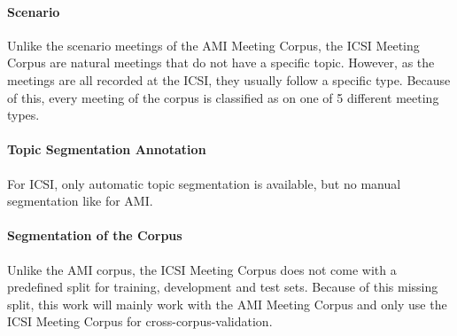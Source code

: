 \paragraph{Scenario}

Unlike the scenario meetings of the AMI Meeting Corpus, the ICSI Meeting Corpus are natural meetings that do not have a specific topic.
However, as the meetings are all recorded at the ICSI, they usually follow a specific type.
Because of this, every meeting of the corpus is classified as on one of 5 different meeting types. \cite{Janin}

\paragraph{Topic Segmentation Annotation}

For ICSI, only automatic topic segmentation is available, but no manual segmentation like for AMI.

\paragraph{Segmentation of the Corpus}

Unlike the AMI corpus, the ICSI Meeting Corpus does not come with a predefined split for training, development and test sets.
Because of this missing split, this work will mainly work with the AMI Meeting Corpus and only use the ICSI Meeting Corpus for cross-corpus-validation.